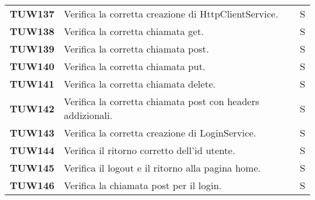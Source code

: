 \documentclass[../../piano-di-qualifica.tex]{subfiles}
\begin{document}
\begin{longtable}[H]{>{\centering\bfseries}m{3cm} >{}m{10cm} >{\centering\arraybackslash}m{3cm}}

  TUW137             & Verifica la corretta creazione di HttpClientService.                                                                & S                             \\

  TUW138             & Verifica la corretta chiamata get.                                                                                  & S                             \\

  TUW139             & Verifica la corretta chiamata post.                                                                                 & S                             \\

  TUW140             & Verifica la corretta chiamata put.                                                                                  & S                             \\

  TUW141             & Verifica la corretta chiamata delete.                                                                               & S                             \\

  TUW142             & Verifica la corretta chiamata post con headers addizionali.                                                         & S                             \\


  TUW143             & Verifica la corretta creazione di LoginService.                                                                     & S                             \\

  TUW144             & Verifica il ritorno corretto dell'id utente.                                                                        & S                             \\

  TUW145             & Verifica il logout e il ritorno alla pagina home.                                                                   & S                             \\

  TUW146             & Verifica la chiamata post per il login.                                                                             & S                             \\


\end{longtable}
\end{document}
